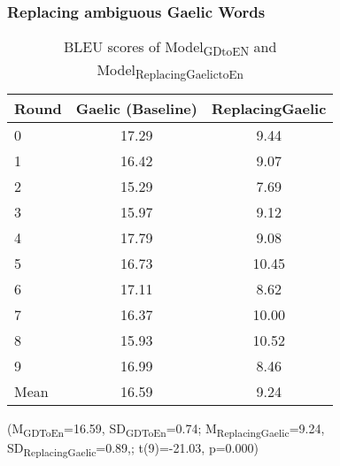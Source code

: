 \documentclass[a4paper]{article}
\begin{document}
\subsubsection{Replacing ambiguous Gaelic Words}\label{treatment:ReplacingGaelic}
\begin{table}[ht]
\centering
\begin{tabular}{lcc}
  \hline
Round & Gaelic (Baseline) & ReplacingGaelic \\ 
  \hline
0 & 17.29 & 9.44 \\ 
  1 & 16.42 & 9.07 \\ 
  2 & 15.29 & 7.69 \\ 
  3 & 15.97 & 9.12 \\ 
  4 & 17.79 & 9.08 \\ 
  5 & 16.73 & 10.45 \\ 
  6 & 17.11 & 8.62 \\ 
  7 & 16.37 & 10.00 \\ 
  8 & 15.93 & 10.52 \\ 
  9 & 16.99 & 8.46 \\ 
   \hline
Mean & 16.59 & 9.24 \\ 
   \hline
\end{tabular}
\caption{BLEU scores of Model\textsubscript{GDtoEN} and Model\textsubscript{ReplacingGaelictoEn}} 
\label{Table:ReplacingGaelic}
\end{table}(M\textsubscript{GDToEn}=16.59, SD\textsubscript{GDToEn}=0.74; M\textsubscript{ReplacingGaelic}=9.24, SD\textsubscript{ReplacingGaelic}=0.89,; t(9)=-21.03, p=0.000)
\end{document}
